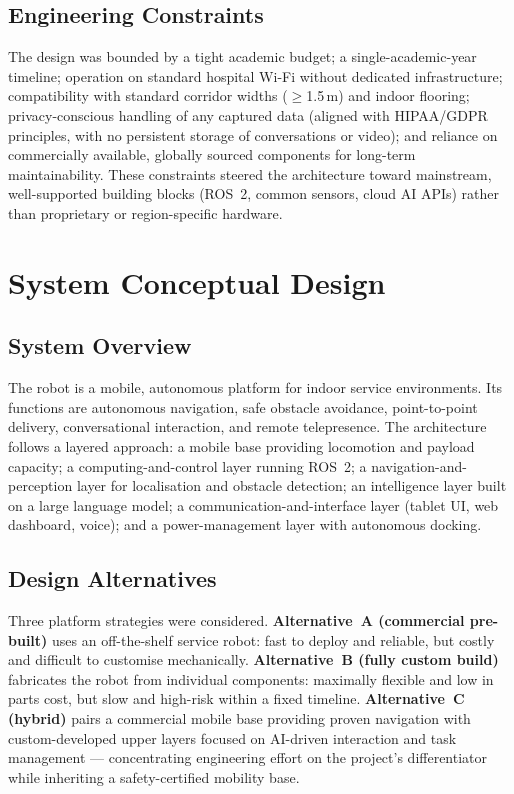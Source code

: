 \documentclass[11pt,a4paper]{article}
\begin{document}
\subsection{Engineering Constraints}
The design was bounded by a tight academic budget; a single-academic-year timeline; operation on standard hospital Wi-Fi without dedicated infrastructure; compatibility with standard corridor widths ($\geq$1.5\,m) and indoor flooring; privacy-conscious handling of any captured data (aligned with HIPAA/GDPR principles, with no persistent storage of conversations or video); and reliance on commercially available, globally sourced components for long-term maintainability. These constraints steered the architecture toward mainstream, well-supported building blocks (ROS~2, common sensors, cloud AI APIs) rather than proprietary or region-specific hardware.

\section{System Conceptual Design}
\label{sec:design}

\subsection{System Overview}
The robot is a mobile, autonomous platform for indoor service environments. Its functions are autonomous navigation, safe obstacle avoidance, point-to-point delivery, conversational interaction, and remote telepresence. The architecture follows a layered approach: a mobile base providing locomotion and payload capacity; a computing-and-control layer running ROS~2; a navigation-and-perception layer for localisation and obstacle detection; an intelligence layer built on a large language model; a communication-and-interface layer (tablet UI, web dashboard, voice); and a power-management layer with autonomous docking.

\subsection{Design Alternatives}
Three platform strategies were considered. \textbf{Alternative~A (commercial pre-built)} uses an off-the-shelf service robot: fast to deploy and reliable, but costly and difficult to customise mechanically. \textbf{Alternative~B (fully custom build)} fabricates the robot from individual components: maximally flexible and low in parts cost, but slow and high-risk within a fixed timeline. \textbf{Alternative~C (hybrid)} pairs a commercial mobile base providing proven navigation with custom-developed upper layers focused on AI-driven interaction and task management --- concentrating engineering effort on the project's differentiator while inheriting a safety-certified mobility base.
\end{document}
